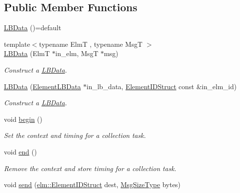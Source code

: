 \subsection*{Public Member Functions}
\begin{DoxyCompactItemize}
\item 
\hyperlink{structvt_1_1ctx_1_1_l_b_data_a2df28bac4813faec6857a0df13692e09}{L\+B\+Data} ()=default
\item 
{\footnotesize template$<$typename ElmT , typename MsgT $>$ }\\\hyperlink{structvt_1_1ctx_1_1_l_b_data_aeee7259db248f19afcc19179c1a623ba}{L\+B\+Data} (ElmT $\ast$in\+\_\+elm, MsgT $\ast$msg)
\begin{DoxyCompactList}\small\item\em Construct a {\ttfamily \hyperlink{structvt_1_1ctx_1_1_l_b_data}{L\+B\+Data}}. \end{DoxyCompactList}\item 
\hyperlink{structvt_1_1ctx_1_1_l_b_data_ac049bfde4cc4820b5e065e1626284b09}{L\+B\+Data} (\hyperlink{structvt_1_1ctx_1_1_l_b_data_a11f1aeb75c01ae0c77d96f94ce1994bb}{Element\+L\+B\+Data} $\ast$in\+\_\+lb\+\_\+data, \hyperlink{structvt_1_1ctx_1_1_l_b_data_aad9fac05c3faf80173b273d900db6fb1}{Element\+I\+D\+Struct} const \&in\+\_\+elm\+\_\+id)
\begin{DoxyCompactList}\small\item\em Construct a {\ttfamily \hyperlink{structvt_1_1ctx_1_1_l_b_data}{L\+B\+Data}}. \end{DoxyCompactList}\item 
void \hyperlink{structvt_1_1ctx_1_1_l_b_data_aa2e69285e6574612807f4960a79ff0ea}{begin} ()
\begin{DoxyCompactList}\small\item\em Set the context and timing for a collection task. \end{DoxyCompactList}\item 
void \hyperlink{structvt_1_1ctx_1_1_l_b_data_a77a4728d5fa97025a9fbe6fce86a08ba}{end} ()
\begin{DoxyCompactList}\small\item\em Remove the context and store timing for a collection task. \end{DoxyCompactList}\item 
void \hyperlink{structvt_1_1ctx_1_1_l_b_data_a9db5527f7fa49548e4a856ea1caff73a}{send} (\hyperlink{structvt_1_1elm_1_1_element_i_d_struct}{elm\+::\+Element\+I\+D\+Struct} dest, \hyperlink{namespacevt_a408e86a8c7c89309b52907dc5a513924}{Msg\+Size\+Type} bytes)

\end{DoxyCompactItemize}
